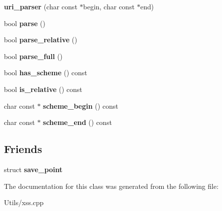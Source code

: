 \begin{DoxyCompactItemize}
\item 
\hypertarget{classcppcms_1_1xss_1_1uri__parser_a593f6d53191bd9ae0c99b309f7c1d5ed}{{\bfseries uri\-\_\-parser} (char const $\ast$begin, char const $\ast$end)}\label{classcppcms_1_1xss_1_1uri__parser_a593f6d53191bd9ae0c99b309f7c1d5ed}

\item 
\hypertarget{classcppcms_1_1xss_1_1uri__parser_a4d398496b02fb677c60b8320c098ad22}{bool {\bfseries parse} ()}\label{classcppcms_1_1xss_1_1uri__parser_a4d398496b02fb677c60b8320c098ad22}

\item 
\hypertarget{classcppcms_1_1xss_1_1uri__parser_afef4a91dff6faeb31d273f5db930312a}{bool {\bfseries parse\-\_\-relative} ()}\label{classcppcms_1_1xss_1_1uri__parser_afef4a91dff6faeb31d273f5db930312a}

\item 
\hypertarget{classcppcms_1_1xss_1_1uri__parser_ae12539019a6c1b46e65175d07be341a0}{bool {\bfseries parse\-\_\-full} ()}\label{classcppcms_1_1xss_1_1uri__parser_ae12539019a6c1b46e65175d07be341a0}

\item 
\hypertarget{classcppcms_1_1xss_1_1uri__parser_a904b3234dfad58d3ffe0121839ec710e}{bool {\bfseries has\-\_\-scheme} () const }\label{classcppcms_1_1xss_1_1uri__parser_a904b3234dfad58d3ffe0121839ec710e}

\item 
\hypertarget{classcppcms_1_1xss_1_1uri__parser_aff3d2402c077787bcb8e8a0b2391c79d}{bool {\bfseries is\-\_\-relative} () const }\label{classcppcms_1_1xss_1_1uri__parser_aff3d2402c077787bcb8e8a0b2391c79d}

\item 
\hypertarget{classcppcms_1_1xss_1_1uri__parser_ab5916c69875593a6a3f238c00f32a721}{char const $\ast$ {\bfseries scheme\-\_\-begin} () const }\label{classcppcms_1_1xss_1_1uri__parser_ab5916c69875593a6a3f238c00f32a721}

\item 
\hypertarget{classcppcms_1_1xss_1_1uri__parser_acba31b0a1c136e6c1e724d70ddd04207}{char const $\ast$ {\bfseries scheme\-\_\-end} () const }\label{classcppcms_1_1xss_1_1uri__parser_acba31b0a1c136e6c1e724d70ddd04207}

\end{DoxyCompactItemize}
\subsection*{Friends}
\begin{DoxyCompactItemize}
\item 
\hypertarget{classcppcms_1_1xss_1_1uri__parser_a8695e8f29233e5cb4bdc1b082d7c6e80}{struct {\bfseries save\-\_\-point}}\label{classcppcms_1_1xss_1_1uri__parser_a8695e8f29233e5cb4bdc1b082d7c6e80}

\end{DoxyCompactItemize}


The documentation for this class was generated from the following file\-:\begin{DoxyCompactItemize}
\item 
Utils/xss.\-cpp\end{DoxyCompactItemize}
